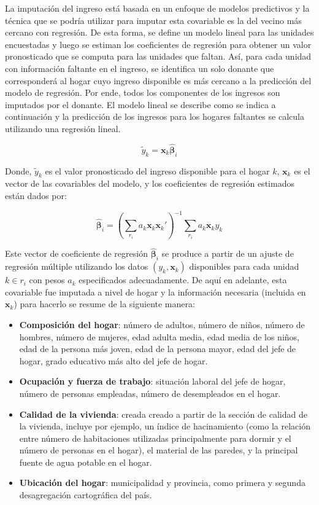 \documentclass[12pt,spanish,]{book}
\providecommand{\tightlist}{%
  \setlength{\itemsep}{0pt}\setlength{\parskip}{0pt}}
\begin{document}
La imputación del ingreso está basada en un enfoque de modelos predictivos y la técnica que se podría utilizar para imputar esta covariable es la del vecino más cercano con regresión. De esta forma, se define un modelo lineal para las unidades encuestadas y luego se estiman los coeficientes de regresión para obtener un valor pronosticado que se computa para las unidades que faltan. Así, para cada unidad con información faltante en el ingreso, se identifica un solo donante que corresponderá al hogar cuyo ingreso disponible es más cercano a la predicción del modelo de regresión. Por ende, todos los componentes de los ingresos son imputados por el donante. El modelo lineal se describe como se indica a continuación y la predicción de los ingresos para los hogares faltantes se calcula utilizando una regresión lineal.

\[\tilde{y}_k = \mathbf{x}_k \hat{\boldsymbol{\beta}}_i\]

Donde, \(\tilde{y}_k\) es el valor pronosticado del ingreso disponible para el hogar \(k\), \(\mathbf{x}_k\) es el vector de las covariables del modelo, y los coeficientes de regresión estimados están dados por:

\[
\hat{\boldsymbol{\beta}}_i = (\sum_{r_i} a_k\mathbf{x}_k\mathbf{x}_k')^{-1}
\sum_{r_i} a_k\mathbf{x}_ky_k
\]

Este vector de coeficiente de regresión \(\hat{\boldsymbol{\beta}}_i\) se produce a partir de un ajuste de regresión múltiple utilizando los datos \((y_k, \mathbf{x}_k)\) disponibles para cada unidad \(k \in r_i\) con pesos \(a_k\) especificados adecuadamente. De aquí en adelante, esta covariable fue imputada a nivel de hogar y la información necesaria (incluida en \(\mathbf{x}_k\)) para hacerlo se resume de la siguiente manera:

\begin{itemize}
\tightlist
\item
  \textbf{Composición del hogar}: número de adultos, número de niños, número de hombres, número de mujeres, edad adulta media, edad media de los niños, edad de la persona más joven, edad de la persona mayor, edad del jefe de hogar, grado educativo más alto del jefe de hogar.
\item
  \textbf{Ocupación y fuerza de trabajo}: situación laboral del jefe de hogar, número de personas empleadas, número de desempleados en el hogar.
\item
  \textbf{Calidad de la vivienda}: creada creado a partir de la sección de calidad de la vivienda, incluye por ejemplo, un índice de hacinamiento (como la relación entre número de habitaciones utilizadas principalmente para dormir y el número de personas en el hogar), el material de las paredes, y la principal fuente de agua potable en el hogar.
\item
  \textbf{Ubicación del hogar}: municipalidad y provincia, como primera y segunda desagregación cartográfica del país.
\end{itemize}
\end{document}
